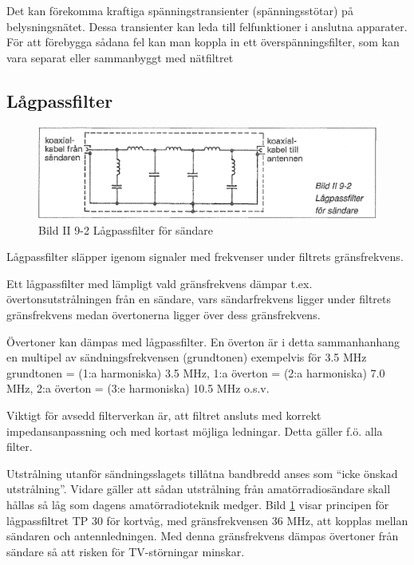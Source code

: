 Det kan förekomma kraftiga spänningstransienter (spänningsstötar) på
belysningsnätet. Dessa transienter kan leda till felfunktioner i
anslutna apparater. För att förebygga sådana fel kan man koppla in ett
överspänningsfilter, som kan vara separat eller sammanbyggt med
nätfiltret

\subsection{Lågpassfilter}

\begin{figure}
  \includegraphics[width=\textwidth]{images/bild_2_9-02}
  \caption{Bild II 9-2 Lågpassfilter för sändare}
  \label{fig:bildII9-2}
\end{figure}

Lågpassfilter släpper igenom signaler med frekvenser under filtrets
gränsfrekvens.

Ett lågpassfilter med lämpligt vald gränsfrekvens dämpar
t.ex. övertonsutstrålningen från en sändare, vars sändarfrekvens
ligger under filtrets gränsfrekvens medan övertonerna ligger över dess
gränsfrekvens.

Övertoner kan dämpas med lågpassfilter. En överton är i detta
sammanhanhang en multipel av sändningsfrekvensen (grundtonen)
exempelvis för 3.5 MHz grundtonen = (1:a harmoniska) 3.5 MHz, 1:a
överton = (2:a harmoniska) 7.0 MHz, 2:a överton = (3:e harmoniska)
10.5 MHz o.s.v.

Viktigt för avsedd filterverkan är, att filtret ansluts med korrekt
impedansanpassning och med kortast möjliga ledningar. Detta gäller
f.ö. alla filter.

Utstrålning utanför sändningsslagets tillåtna bandbredd anses som
``icke önskad utstrålning''. Vidare gäller att sådan utstrålning från
amatörradiosändare skall hållas så låg som dagens amatörradioteknik
medger.  Bild \ref{fig:bildII9-2} visar principen för lågpassfiltret TP 30 för
kortvåg, med gränsfrekvensen 36 MHz, att kopplas mellan sändaren och
antennledningen. Med denna gränsfrekvens dämpas övertoner från sändare
så att risken för TV-störningar minskar.

